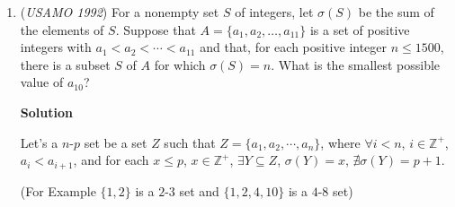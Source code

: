 \begin{enumerate}
 This is an identity $\tan{a} - \tan{b} = \frac {\sin{(a - b)}}{\cos{a}\cos{b}}$

 Therefore;

 $\sum_{i = 1}^{89}[\tan{k} - \tan{(k - 1)}] = \tan{89} - \tan{0} = \cot{1}$, because of telescoping. 

 but since we multiplied $\sin{1}$ in the beginning, we need to divide by $\sin{1}$. So we get that:

 $\frac {1}{\cos{0}\cos{1}} + \frac {1}{\cos{1}\cos{2}} + \frac {1}{\cos{2}\cos{3}} + .... + \frac {1}{\cos{88}\cos{89}} = \frac {\cos{1}}{\sin^2{1}}$as desired. QED

 



\textbf{Solution 4}

Let $S = \frac{1}{\cos 0^\circ\cos 1^\circ} + \frac{1}{\cos 1^\circ\cos 2^\circ} + ... + \frac{1}{\cos 88^\circ\cos 89^\circ}$.

 Multiplying by $\sin 1^\circ$ gives
 \[S \sin 1^\circ = \frac{\sin(1^\circ-0^\circ)}{\cos 0^\circ\cos 1^\circ} + ... + \frac{\sin(89^\circ-88^\circ)}{\cos 88^\circ\cos 89^\circ}\]

 Notice that $\frac{\sin((x+1^\circ)-x)}{\cos 0^\circ\cos 1^\circ} = \tan (x+1^\circ) - \tan x$ after expanding the sine, and so
 \[S \sin 1^\circ = \left(\tan 1^\circ - \tan 0^\circ\right) + \cdots + \left(\tan 89^\circ - \tan 88^\circ\right) = \tan 89^\circ - \tan 0^\circ = \cot 1^\circ = \frac{\cos 1^\circ}{\sin 1^\circ},\] so 
 \[S = \frac{\cos 1^\circ}{\sin^21^\circ}.\]



	\item (\textit{USAMO 1992}) For a nonempty set $S$ of integers, let $\sigma(S)$ be the sum of the elements of $S$. Suppose that $A = \{a_1, a_2, \ldots, a_{11}\}$ is a set of positive integers with $a_1 < a_2 < \cdots < a_{11}$ and that, for each positive integer $n \le 1500$, there is a subset $S$ of $A$ for which $\sigma(S) = n$. What is the smallest possible value of $a_{10}$?


 



\textbf{Solution}

Let's a $n$-$p$ set be a set $Z$ such that $Z=\{a_1,a_2,\cdots,a_n\}$, where $\forall i<n$, $i\in \mathbb{Z}^+$, $a_i<a_{i+1}$, and for each $x\le p$, $x\in \mathbb{Z}^+$, $\exists Y\subseteq Z$, $\sigma(Y)=x$, $\nexists \sigma(Y)=p+1$.

 (For Example $\{1,2\}$ is a $2$-$3$ set and $\{1,2,4,10\}$ is a $4$-$8$ set)


\end{enumerate}
